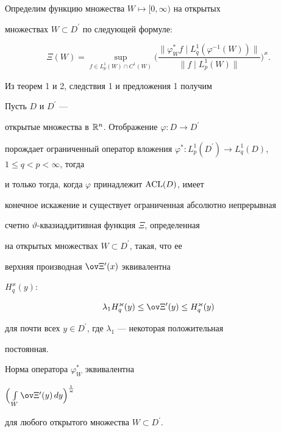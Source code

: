 Определим функцию множества $W\mapsto[0,\infty)$ на открытых


множествах $W\subset D^{\prime}$ по следующей формуле:


$$


\Xi(W)=\sup_{f\in{L}_{p}^{1}(W)\cap C^1(W)}


\bigg(\frac{\|\varphi_W^{\ast} f\mid


{L}_{q}^{1}(\varphi^{-1}(W))\|} {\|f\mid


{L}_{p}^{1}(W)\|} \bigg)^{\varkappa}.


$$





Из теорем 1 и 2, следствия 1 и предложения 1 получим





\begin{cor}


Пусть $D$ и $D^{\prime}$ ---


открытые множества в ${\Bbb R}^n$. Отображение $\varphi :D\to D^{\prime}$


порождает ограниченный оператор вложения $\varphi^{*}


:L_{p}^{1}(D^{\prime})\to L_{q}^{1}(D)$, $1\leq q<p<\infty$, тогда


и только тогда, когда $\varphi$ принадлежит $\operatorname{ACL}(D)$, имеет


конечное искажение и существует ограниченная абсолютно непрерывная


счетно $\vartheta$-квазиаддитивная функция $\Xi$, определенная


на открытых множествах $W\subset D^{\prime}$, такая, что ее


верхняя производная $\ov\Xi{}^{\prime}(x)$ эквивалентна


$H^\varkappa_q(y){:}$


$$


\lambda_1 H^\varkappa_q(y)\leq


\ov\Xi{}^{\prime}(y)\leq H^\varkappa_q(y)


$$


для почти всех $y\in


D^{\prime}$, где $\lambda_1$ --- некоторая положительная


постоянная.





Норма оператора $\varphi^{*}_W$ эквивалентна


$\Big(\int\limits_W\ov\Xi{}^{\prime}(y)\,dy\Big)^{\frac{1}{\varkappa}}$


для любого открытого множества $W\subset D^{\prime}$.


\end{cor}





